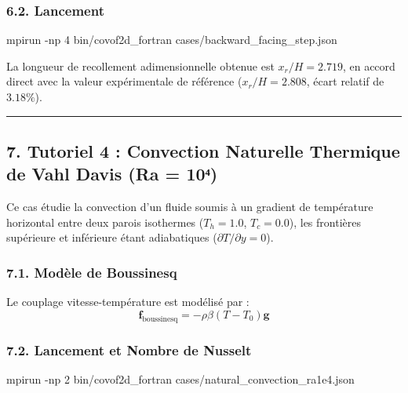 \documentclass[
  french,
]{article}
\newenvironment{Shaded}{}{}
\newcommand{\AttributeTok}[1]{\textcolor[rgb]{0.49,0.56,0.16}{#1}}
\newcommand{\ExtensionTok}[1]{#1}
\newcommand{\NormalTok}[1]{#1}
\begin{document}
\subsubsection{6.2. Lancement}\label{lancement-1}

\begin{Shaded}
\begin{Highlighting}[]
\ExtensionTok{mpirun} \AttributeTok{{-}np}\NormalTok{ 4 bin/covof2d\_fortran cases/backward\_facing\_step.json}
\end{Highlighting}
\end{Shaded}

La longueur de recollement adimensionnelle obtenue est
\(x_r / H = 2.719\), en accord direct avec la valeur expérimentale de
référence (\(x_r / H = 2.808\), écart relatif de \(3.18\%\)).

\begin{center}\rule{0.5\linewidth}{0.5pt}\end{center}

\subsection{7. Tutoriel 4 : Convection Naturelle Thermique de Vahl Davis
(Ra =
10⁴)}\label{tutoriel-4-convection-naturelle-thermique-de-vahl-davis-ra-10ux2074}

Ce cas étudie la convection d'un fluide soumis à un gradient de
température horizontal entre deux parois isothermes (\(T_h = 1.0\),
\(T_c = 0.0\)), les frontières supérieure et inférieure étant
adiabatiques (\(\partial T / \partial y = 0\)).

\subsubsection{7.1. Modèle de Boussinesq}\label{moduxe8le-de-boussinesq}

Le couplage vitesse-température est modélisé par :
\[\mathbf{f}_{\text{boussinesq}} = -\rho \beta (T - T_0) \mathbf{g}\]

\subsubsection{7.2. Lancement et Nombre de
Nusselt}\label{lancement-et-nombre-de-nusselt}

\begin{Shaded}
\begin{Highlighting}[]
\ExtensionTok{mpirun} \AttributeTok{{-}np}\NormalTok{ 2 bin/covof2d\_fortran cases/natural\_convection\_ra1e4.json}
\end{Highlighting}
\end{Shaded}
\end{document}
